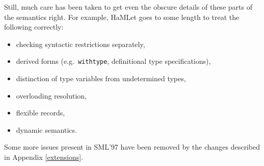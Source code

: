 \documentclass[twoside,titlepage]{article}
\newcommand{\void}[1]{}
\begin{document}
Still, much care has been taken to get even the obscure details of these parts of the semantics right. For example, HaMLet goes to some length to treat the following correctly:

\begin{itemize}
\setlength{\parskip}{0ex}
\item checking syntactic restrictions separately,
\item derived forms (e.g.\ {\tt withtype}, definitional type specifications),
\item distinction of type variables from undetermined types,
\item overloading resolution,
\item flexible records,
\item dynamic semantics.
\end{itemize}

Some more issues present in SML'97 have been removed by the changes described in Appendix \ref{extensions}.

\void{
The {\tt test} directory in the HaMLet distribution contains some contrived examples of these and other code that is rejected by several SML systems despite being correct according to the Definition. HaMLet accepts all but two of them. Consequently, we are positive that HaMLet is more accurate in implementing the SML language specification than most other systems. There still are some deviations, though:

\begin{itemize}
\setlength{\parskip}{0ex}
\item inability to parse some legal SML programs (\ref{ambiguities}),
\item non-principal types for equality polymorphic functions in an {\tt abstype} declaration (see \ref{bugschapter4}),
\item non-principal types for non-generalized declarations in functors (see \ref{bugschapter5}).
\end{itemize}

We consider all of these minor, since no existing SML implementations is able to deal with them. They are arguably mistakes on the side of the Definition, see \ref{bugsappendixa}, \ref{bugschapter2} and \ref{bugschapter4}. Still, we hope to fix these issues in future releases. Moreover, we plan to provide a more complete implementation of the Standard Basis Library.
}
\end{document}
